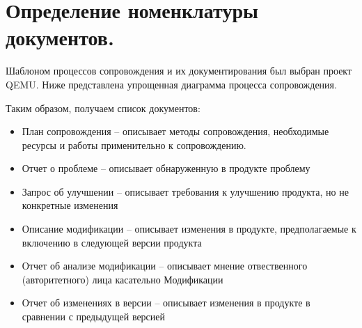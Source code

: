 
\pagebreak


\section{Определение номенклатуры документов.}

Шаблоном процессов сопровождения и их документирования был выбран проект QEMU\cite{qemu,qemucontribute}.
Ниже представлена упрощенная диаграмма процесса сопровождения.

\begin{figure}[ht]
    \begin{center}
    \end {center}\label{fig:maintenance_process}
\end {figure}

Таким образом, получаем список документов:

\begin{itemize}
    \item План сопровождения -- описывает методы сопровождения, необходимые ресурсы и работы применительно к сопровождению.

    \item Отчет о проблеме -- описывает обнаруженную в продукте проблему

    \item Запрос об улучшении -- описывает требования к улучшению продукта, но не конкретные изменения

    \item Описание модификации -- описывает изменения в продукте, предполагаемые к включению в следующей версии продукта

    \item Отчет об анализе модификации -- описывает мнение отвественного (авторитетного) лица касательно Модификации

    \item Отчет об изменениях в версии -- описывает изменения в продукте в сравнении с предыдущей версией
\end{itemize}
